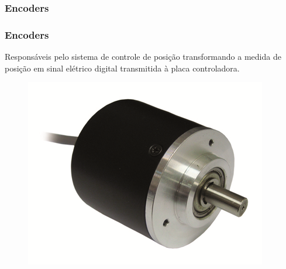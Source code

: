 \subsubsection{Encoders}

\begin{frame}
\frametitle{Encoders}

Responsáveis pelo sistema de controle de posição transformando a medida de posição em sinal elétrico digital transmitida à placa controladora.

\begin{figure}
\centering
\includegraphics[scale = 0.5]{figs/encoder}
\end{figure}

\end{frame}
